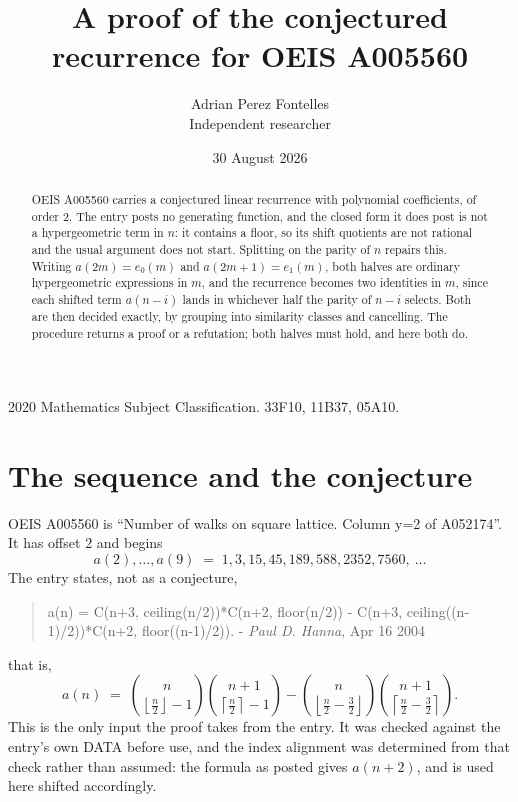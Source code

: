 \documentclass[11pt,a4paper]{article}
\title{A proof of the conjectured recurrence for OEIS A005560}
\author{Adrian Perez Fontelles\\ \small Independent researcher}
\date{30 August 2026}
\theoremstyle{plain}
\theoremstyle{definition}
\begin{document}
\maketitle

\begin{abstract}
OEIS A005560 carries a conjectured linear recurrence with polynomial coefficients, of
order 2. The entry posts no generating function, and the closed form it does post
is not a hypergeometric term in $n$: it contains a floor, so its shift quotients are not
rational and the usual argument does not start. Splitting on the parity of $n$ repairs
this. Writing $a(2m)=e_{0}(m)$ and $a(2m+1)=e_{1}(m)$, both halves are ordinary
hypergeometric expressions in $m$, and the recurrence becomes two identities in $m$, since
each shifted term $a(n-i)$ lands in whichever half the parity of $n-i$ selects. Both are
then decided exactly, by grouping into similarity classes and cancelling. The procedure
returns a proof or a refutation; both halves must hold, and here both do.
\end{abstract}

\noindent\small 2020 Mathematics Subject Classification. 33F10, 11B37, 05A10.\normalsize

\section{The sequence and the conjecture}

OEIS A005560 is ``Number of walks on square lattice. Column y=2 of A052174''. It has offset $2$ and begins
\[
a(2),\dots,a(9)\;=\;1, 3, 15, 45, 189, 588, 2352, 7560,\ \dots
\]
The entry states, not as a conjecture,
\begin{quote}\small
a(n) = C(n+3, ceiling(n/2))*C(n+2, floor(n/2)) - C(n+3, ceiling((n-1)/2))*C(n+2, floor((n-1)/2)). - \emph{Paul D. Hanna}, Apr 16 2004
\end{quote}
that is,
\begin{equation}\label{eq:cf}
a(n)\;=\;{\binom{n}{\left\lfloor{\frac{n}{2}}\right\rfloor - 1}} {\binom{n + 1}{\left\lceil{\frac{n}{2}}\right\rceil - 1}} - {\binom{n}{\left\lfloor{\frac{n}{2} - \frac{3}{2}}\right\rfloor}} {\binom{n + 1}{\left\lceil{\frac{n}{2} - \frac{3}{2}}\right\rceil}} .
\end{equation}
This is the only input the proof takes from the entry. It was checked against the entry's
own DATA before use, and the index alignment was determined from that check rather than
assumed: the formula as posted gives $a(n+2)$, and is used here shifted accordingly.
\end{document}
